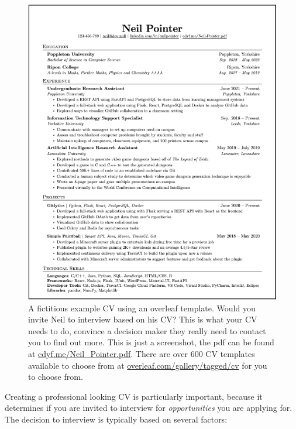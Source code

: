 \documentclass[
]{book}
\begin{document}
\begin{figure}

{\centering \includegraphics[width=1\linewidth]{images/jake-ryan} 

}

\caption{A fictitious example CV using an overleaf template. Would you invite Neil to interview based on his CV? This is what your CV needs to do, convince a decision maker they really need to contact you to find out more. This is just a screenshot, the pdf can be found at \href{https://www.cdyf.me/Neil_Pointer.pdf}{cdyf.me/Neil\_Pointer.pdf}. There are over 600 CV templates available to choose from at \href{https://www.overleaf.com/gallery/tagged/cv}{overleaf.com/gallery/tagged/cv} for you to choose from.}\label{fig:cv-fig}
\end{figure}



Creating a professional looking CV is particularly important, because it determines if you are invited to interview for \emph{opportunities} you are applying for. The decision to interview is typically based on several factors:
\end{document}
